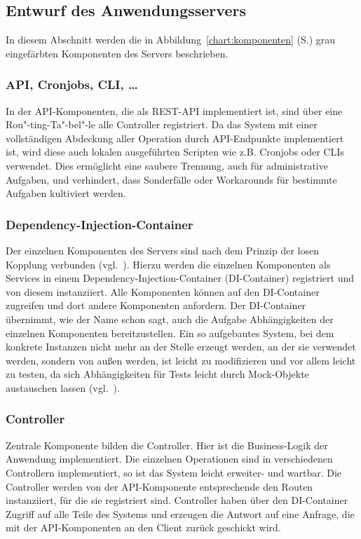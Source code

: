 \subsection{Entwurf des Anwendungsservers}\label{l:entwurf-server}

In diesem Abschnitt werden die in Abbildung~\ref{chart:komponenten} (S.\pageref{chart:komponenten}) grau eingefärbten Komponenten des Servers beschrieben.

\subsubsection{API, Cronjobs, CLI, …}

In der API-Komponenten, die als REST-API implementiert ist, sind über eine Rou"-ting-Ta"-bel"-le alle Controller registriert. Da das System mit einer vollständigen Abdeckung aller Operation durch API-Endpunkte implementiert ist, wird diese auch lokalen ausgeführten Scripten wie z.B. Cronjobs oder CLIs verwendet. Dies ermöglicht eine saubere Trennung, auch für administrative Aufgaben, und verhindert, dass Sonderfälle oder Workarounds für bestimmte Aufgaben kultiviert werden.

\subsubsection{Dependency-Injection-Container}

Der einzelnen Komponenten des Servers sind nach dem Prinzip der losen Kopplung verbunden (vgl.~\cite[S.62]{hn-web20}). Hierzu werden die einzelnen Komponenten als Services in einem Dependency-Injection-Container (DI-Container) registriert und von diesem instanziiert. Alle Komponenten können auf den DI-Container zugreifen und dort andere Komponenten anfordern. Der DI-Container übernimmt, wie der Name schon sagt, auch die Aufgabe Abhängigkeiten der einzelnen Komponenten bereitzustellen. Ein so aufgebautes System, bei dem konkrete Instanzen nicht mehr an der Stelle erzeugt werden, an der sie verwendet werden, sondern von außen  werden, ist leicht zu modifizieren und vor allem leicht zu testen, da sich Abhängigkeiten für Tests leicht durch Mock-Objekte austauschen lassen (vgl.~\cite[Kap.2]{freeman2009growing}).

\subsubsection{Controller}

Zentrale Komponente bilden die Controller. Hier ist die Business-Logik der Anwendung implementiert. Die einzelnen Operationen sind in verschiedenen Controllern implementiert, so ist das System leicht erweiter- und wartbar. Die Controller werden von der API-Komponente entsprechende den Routen instanziiert, für die sie registriert sind. Controller haben über den DI-Container Zugriff auf alle Teile des Systems und erzeugen die Antwort auf eine Anfrage, die mit der API-Komponenten an den Client zurück geschickt wird.


